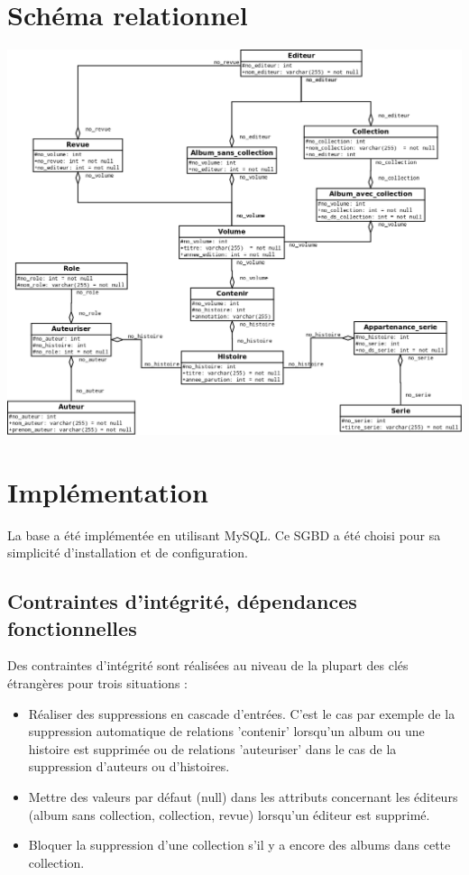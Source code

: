\documentclass[12pt]{article}
\begin{document}
\section{Schéma relationnel}

\noindent\includegraphics[width=\textwidth]{schema-relation}

\section{Implémentation}

La base a été implémentée en utilisant MySQL. Ce SGBD a été choisi pour sa
simplicité d'installation et de configuration.

\subsection{Contraintes d'intégrité, dépendances fonctionnelles}

Des contraintes d'intégrité sont réalisées au niveau de la plupart des clés
étrangères pour trois situations : 
\begin{itemize}
	\item Réaliser des suppressions en cascade d'entrées. C'est le cas par
		exemple de la suppression automatique de relations 'contenir'
		lorsqu'un album ou une histoire est supprimée ou de relations
		'auteuriser' dans le cas de la suppression d'auteurs ou d'histoires.
	\item Mettre des valeurs par défaut (null) dans les attributs concernant les
		éditeurs (album sans collection, collection, revue) lorsqu'un éditeur
		est supprimé.
	\item Bloquer la suppression d'une collection s'il y
		a encore des albums dans cette collection.
\end{itemize}
\end{document}
